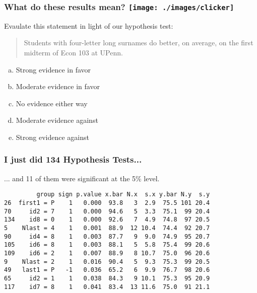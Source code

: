 \begin{frame}[c]\frametitle{What do these results mean? \hfill \texttt{[image: ./images/clicker]}}

Evaulate this statement in light of our hypothesis test:
\vspace{1em}

\begin{quote}
	Students with four-letter long surnames do better, on average, on the first midterm of Econ 103 at UPenn.
\end{quote}

\begin{enumerate}[(a)]
	\item Strong evidence in favor
	\item Moderate evidence in favor
	\item No evidence either way
	\item Moderate evidence against
	\item Strong evidence against
\end{enumerate}
\end{frame}
\begin{frame}[c,fragile]\frametitle{I just did 134 Hypothesis Tests...}
   
 \begin{block}
 	{... and 11 of them were significant at the 5\% level.}
 \end{block}

\footnotesize

\begin{verbatim}
         group sign p.value x.bar N.x  s.x y.bar N.y  s.y
26  first1 = P    1   0.000  93.8   3  2.9  75.5 101 20.4
70     id2 = 7    1   0.000  94.6   5  3.3  75.1  99 20.4
134    id8 = 0    1   0.000  92.6   7  4.9  74.8  97 20.5
5    Nlast = 4    1   0.001  88.9  12 10.4  74.4  92 20.7
90     id4 = 8    1   0.003  87.7   9  9.0  74.9  95 20.7
105    id6 = 8    1   0.003  88.1   5  5.8  75.4  99 20.6
109    id6 = 2    1   0.007  88.9   8 10.7  75.0  96 20.6
9    Nlast = 2    1   0.016  90.4   5  9.3  75.3  99 20.5
49   last1 = P   -1   0.036  65.2   6  9.9  76.7  98 20.6
65     id2 = 1    1   0.038  84.3   9 10.1  75.3  95 20.9
117    id7 = 8    1   0.041  83.4  13 11.6  75.0  91 21.1
\end{verbatim}
\end{frame}


